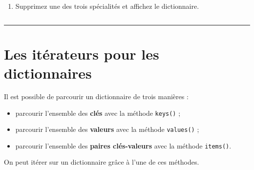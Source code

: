 \documentclass[12pt]{book}
\begin{document}
    \begin{tcolorbox}[breakable, size=fbox, boxrule=1pt, pad at break*=1mm,colback=cellbackground, colframe=cellborder]
\begin{Verbatim}[commandchars=\\\{\}]

\end{Verbatim}
\end{tcolorbox}

    \begin{enumerate}
\def\labelenumi{\arabic{enumi}.}
\setcounter{enumi}{4}
\tightlist
\item
  Supprimez une des trois spécialités et affichez le dictionnaire.
\end{enumerate}

    \begin{tcolorbox}[breakable, size=fbox, boxrule=1pt, pad at break*=1mm,colback=cellbackground, colframe=cellborder]
\begin{Verbatim}[commandchars=\\\{\}]

\end{Verbatim}
\end{tcolorbox}

    \begin{center}\rule{0.5\linewidth}{0.5pt}\end{center}

\hypertarget{les-ituxe9rateurs-pour-les-dictionnaires}{%
\section{Les itérateurs pour les
dictionnaires}\label{les-ituxe9rateurs-pour-les-dictionnaires}}

Il est possible de parcourir un dictionnaire de trois manières :

\begin{itemize}
\tightlist
\item
  parcourir l'ensemble des \textbf{clés} avec la méthode \texttt{keys()}
  ;
\item
  parcourir l'ensemble des \textbf{valeurs} avec la méthode
  \texttt{values()} ;
\item
  parcourir l'ensemble des \textbf{paires clés-valeurs} avec la méthode
  \texttt{items()}.
\end{itemize}

On peut itérer sur un dictionnaire grâce à l'une de ces méthodes.
\end{document}
